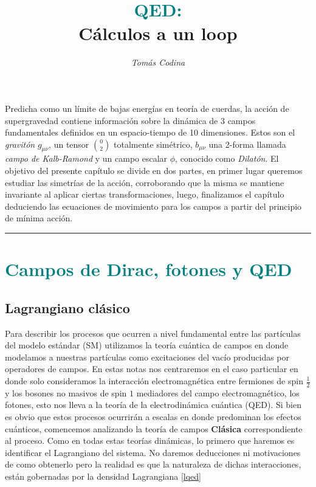 \documentclass{article}
\title{\vspace{-35pt}\huge{\textbf{\textcolor{teal}{QED:}}} \\ \vspace{0.1cm} \large{\textbf{Cálculos a un loop}}}
\date{\vspace{-20pt}}
\author{\textit{Tomás Codina}}
\numberwithin{equation}{section}
\begin{document}
\maketitle
\thispagestyle{fancy}






Predicha como un límite de bajas energías en teoría de cuerdas, la acción de supergravedad contiene información sobre la dinámica de 3 campos fundamentales definidos en un espacio-tiempo de 10 dimensiones. Estos son el \textit{gravitón} $ g_{\mu\nu} $, un tensor $ \binom{0}{2} $ totalmente simétrico, $ b_{\mu\nu} $ una 2-forma llamada \textit{campo de Kalb-Ramond} y un campo escalar $ \phi $, conocido como \textit{Dilatón}. El objetivo del presente capítulo se divide en dos partes, en primer lugar queremos estudiar las simetrías de la acción, corroborando que la misma se mantiene invariante al aplicar ciertas transformaciones, luego, finalizamos el capítulo deduciendo las ecuaciones de movimiento para los campos a partir del principio de mínima acción.  

\rule{\textwidth}{0.4pt}


\section{\textcolor{teal}{Campos de Dirac, fotones y QED}}\label{sim}
	
\subsection{Lagrangiano clásico}
Para describir los procesos que ocurren a nivel fundamental entre las
partículas del modelo estándar (SM) utilizamos la teoría cuántica de campos
en donde modelamos a nuestras partículas como excitaciones del vacío
producidas por operadores de campos. En estas notas nos centraremos en el caso particular en donde solo consideramos la interacción electromagnética entre fermiones de spin $ \frac{1}{2} $ y los bosones no masivos de spin $ 1 $ mediadores del campo electromagnético, los fotones, esto nos lleva a la teoría de la electrodinámica cuántica (QED). Si bien es obvio que estos procesos ocurrirán a escalas en donde predominan los efectos cuánticos, comencemos analizando la teoría de campos \textbf{Clásica} correspondiente al proceso. Como en todas estas teorías dinámicas, lo primero que haremos es identificar el Lagrangiano del sistema. No daremos deducciones ni motivaciones de como obtenerlo pero la realidad es que la naturaleza de dichas interacciones, están gobernadas por la densidad Lagrangiana \ref{lqed}
\end{document}
